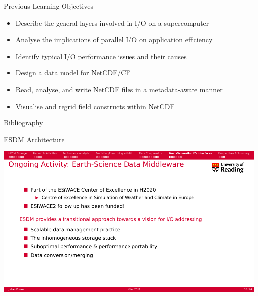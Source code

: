 \documentclass[compress,11pt,xcolor=svgnames,aspectratio=169]{beamer}
\begin{document}
\begin{frame}[fragile]{Previous Learning Objectives}

\begin{itemize}

    \item Describe the general layers involved in I/O on a supercomputer
    \item Analyse the implications of parallel I/O on application efficiency
    \item Identify typical I/O performance issues and their causes
    \item Design a data model for NetCDF/CF
    \item Read, analyse, and write NetCDF files in a metadata-aware manner
    \item Visualise and regrid field constructs within NetCDF

\end{itemize}

\end{frame}

\begin{frame}[allowframebreaks]{Bibliography}

{

\tiny




}

\end{frame}

\acknowledgement

\appendix

\begin{frame}[fragile]{}

{ \huge \color{EsiBlue}{ Appendix}}

\end{frame}

\begin{frame}[fragile]{ESDM Architecture}

\begin{center}
\includegraphics[scale=0.6]{fig/esdm}
\end{center}

\end{frame}
\end{document}
